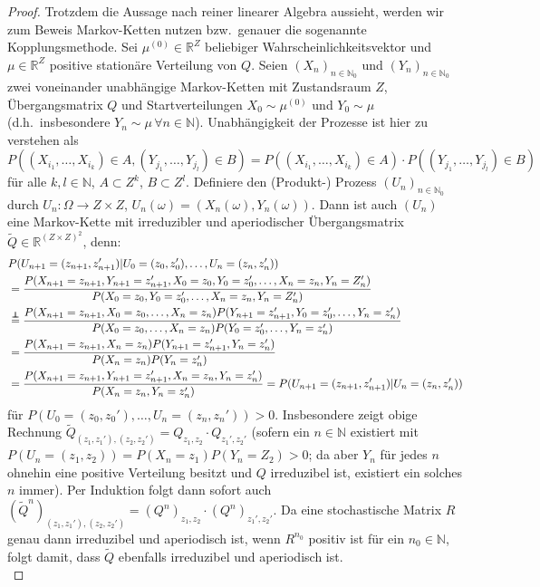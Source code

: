 \documentclass[twoside]{article}
\newcommand\independent{\protect\mathpalette{\protect\independenT}{\perp}}
\def\independenT#1#2{\mathrel{\rlap{$#1#2$}\mkern2mu{#1#2}}}
\theoremstyle{definition}
\begin{document}
\begin{proof}
Trotzdem die Aussage nach reiner linearer Algebra aussieht, werden wir zum Beweis Markov-Ketten nutzen bzw.\ genauer die sogenannte Kopplungsmethode. Sei $\mu^{(0)} \in \mathbb{R}^Z$ beliebiger Wahrscheinlichkeitsvektor und $\mu \in \mathbb{R}^Z$ positive stationäre Verteilung von $Q$. Seien $(X_n)_{n \in \mathbb{N}_0}$ und $(Y_n)_{n \in \mathbb{N}_0}$ zwei voneinander unabhängige Markov-Ketten mit Zustandsraum $Z$, Übergangsmatrix $Q$ und Startverteilungen $X_0 \sim \mu^{(0)}$ und $Y_0 \sim \mu$ (d.h.\ insbesondere $Y_n \sim \mu \, \forall n \in \mathbb{N}$). Unabhängigkeit der Prozesse ist hier zu verstehen als $P((X_{i_1}, \dots , X_{i_k}) \in A, (Y_{j_1}, \dots , Y_{j_l}) \in B) = P((X_{i_1}, \dots , X_{i_k}) \in A) \cdot  P((Y_{j_1}, \dots , Y_{j_l}) \in B)$ für alle $k,l \in \mathbb{N}$, $A \subset Z^k$, $B \subset Z^l$.  Definiere den (Produkt-) Prozess $(U_n)_{n \in \mathbb{N}_0}$ durch $U_n: \Omega \to Z \times Z$, $U_n(\omega) = (X_n(\omega),Y_n(\omega))$. Dann ist auch $(U_n)$ eine Markov-Kette mit irreduzibler und aperiodischer Übergangsmatrix $\tilde{Q} \in \mathbb{R}^{(Z\times Z)^2}$, denn: 
\begin{align}
&P(U_{n+1} = (z_{n+1},z_{n+1}') | U_0 = (z_{0},z_{0}'), \dots , U_n = (z_{n},z_{n}'))\\  
&= \frac{P(X_{n+1} = z_{n+1}, Y_{n+1} = z_{n+1}', X_0 = z_0, Y_0 = z_0', \dots ,X_n = z_n, Y_n = Z_n')}{P(X_0 = z_0, Y_0 = z_0', \dots, X_n = z_n, Y_n = Z_n')}\\
&\overset{\independent}{=} \frac{P(X_{n+1} = z_{n+1}, X_0 = z_0, \dots, X_n = z_n) P(Y_{n+1} = z_{n+1}', Y_0 = z_0', \dots ,Y_n = z_n')}{P(X_0 = z_0, \dots, X_n = z_n)P(Y_0 = z_0', \dots, Y_n = z_n')}\\
&= \frac{P(X_{n+1} = z_{n+1}, X_n = z_n) P(Y_{n+1} = z_{n+1}', Y_n = z_n')}{P(X_n = z_n)P(Y_n = z_n')}\\
&= \frac{P(X_{n+1} = z_{n+1}, Y_{n+1} = z_{n+1}',X_n = z_n,Y_n = z_n')}{P(X_n = z_n, Y_n = z_n')} = P(U_{n+1} = (z_{n+1},z_{n+1}') | U_n = (z_{n},z_{n}'))
\end{align}
für $P(U_0 = (z_{0},z_{0}'), \dots , U_n = (z_{n},z_{n}'))>0$. Insbesondere zeigt obige Rechnung $\tilde{Q}_{(z_1,z_1'),(z_2,z_2')} =  Q_{z_1,z_2} \cdot Q_{z_1',z_2'}$ (sofern ein $n \in \mathbb{N}$ existiert mit $P(U_n = (z_1,z_2)) = P(X_n=z_1)P(Y_n=Z_2)>0$; da aber $Y_n$ für jedes $n$ ohnehin eine positive Verteilung besitzt und $Q$ irreduzibel ist, existiert ein solches $n$ immer). Per Induktion folgt dann sofort auch $(\tilde{Q}^n)_{(z_1,z_1'),(z_2,z_2')} =  (Q^n)_{z_1,z_2} \cdot (Q^n)_{z_1',z_2'}$. Da eine stochastische Matrix $R$ genau dann irreduzibel und aperiodisch ist, wenn $R^{n_0}$  positiv ist für ein $n_0 \in \mathbb{N}$, folgt damit, dass $\tilde{Q}$ ebenfalls irreduzibel und aperiodisch ist.\\

\end{proof}
\end{document}
